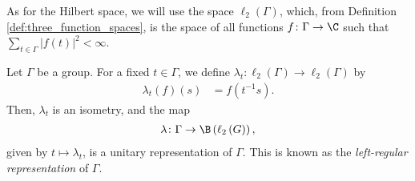 As for the Hilbert space, we will use the space $\ell_2\left( \Gamma \right)$, which, from Definition \ref{def:three_function_spaces}, is the space of all functions $f\colon \Gamma\rightarrow \C$ such that $\sum_{t\in \Gamma}\left\vert f(t) \right\vert^2 < \infty$.
\begin{theorem}
  Let $\Gamma$ be a group. For a fixed $t\in\Gamma$, we define $\lambda_t\colon \ell_2\left( \Gamma \right)\rightarrow \ell_2\left( \Gamma \right)$ by
  \begin{align*}
    \lambda_t\left( f \right)\left( s \right) &= f\left( t^{-1}s \right).
  \end{align*}
  Then, $\lambda_t$ is an isometry, and the map
  \begin{align*}
    \lambda\colon \Gamma\rightarrow \B\left( \ell_2\left( G \right) \right),
  \end{align*}
  given by $t\mapsto \lambda_t$, is a unitary representation of $\Gamma$. This is known as the \textit{left-regular representation} of $\Gamma$.
\end{theorem}
